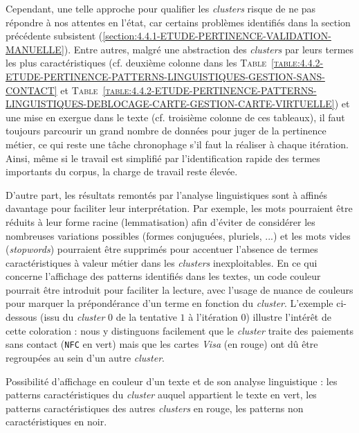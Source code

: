 			Cependant, une telle approche pour qualifier les \textit{clusters} risque de ne pas répondre à nos attentes en l'état, car certains problèmes identifiés dans la section précédente subsistent (\ref{section:4.4.1-ETUDE-PERTINENCE-VALIDATION-MANUELLE}).
			Entre autres, malgré une abstraction des \textit{clusters} par leurs termes les plus caractéristiques (cf. deuxième colonne dans les \textsc{Table~\ref{table:4.4.2-ETUDE-PERTINENCE-PATTERNS-LINGUISTIQUES-GESTION-SANS-CONTACT}} et \textsc{Table~\ref{table:4.4.2-ETUDE-PERTINENCE-PATTERNS-LINGUISTIQUES-DEBLOCAGE-CARTE-GESTION-CARTE-VIRTUELLE}}) et une mise en exergue dans le texte (cf. troisième colonne de ces tableaux), il faut toujours parcourir un grand nombre de données pour juger de la pertinence métier, ce qui reste une tâche chronophage s'il faut la réaliser à chaque itération.
			Ainsi, même si le travail est simplifié par l'identification rapide des termes importants du corpus, la charge de travail reste élevée.
			
			D'autre part, les résultats remontés par l'analyse linguistiques sont à affinés davantage pour faciliter leur interprétation.
			Par exemple, les mots pourraient être réduits à leur forme racine (lemmatisation) afin d'éviter de considérer les nombreuses variations possibles (formes conjuguées, pluriels, ...) et les mots vides (\textit{stopwords}) pourraient être supprimés pour accentuer l'absence de termes caractéristiques à valeur métier dans les \textit{clusters} inexploitables.
			En ce qui concerne l'affichage des patterns identifiés dans les textes, un code couleur pourrait être introduit pour faciliter la lecture, avec l'usage de nuance de couleurs pour marquer la prépondérance d'un terme en fonction du \textit{cluster}.
			L'exemple ci-dessous (issu du \textit{cluster} $0$ de la tentative $1$ à l'itération $0$) illustre l'intérêt de cette coloration : nous y distinguons facilement que le \textit{cluster} traite des paiements sans contact (\texttt{NFC} en vert) mais que les cartes \textit{Visa} (en rouge) ont dû être regroupées au sein d'un autre \textit{cluster}.

			\begin{leftBarExamples}
				Possibilité d'affichage en couleur d'un texte et de son analyse linguistique : les patterns caractéristiques du \textit{cluster} auquel appartient le texte en vert, les patterns caractéristiques des autres \textit{clusters} en rouge, les patterns non caractéristiques en noir.
				\begin{quote}
				\end{quote}
			\end{leftBarExamples}
			
